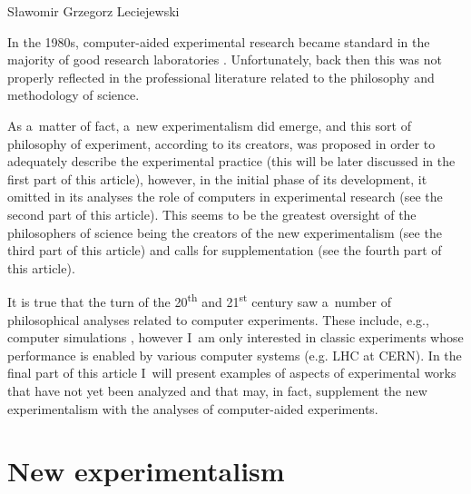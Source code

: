 \begin{artengenv}{Sławomir Grzegorz Leciejewski}
\enlargethispage{1.5\baselineskip}

In the 1980s, computer-aided experimental research became standard in the majority of good research laboratories 
\parencite[][]{crowley-milling_computer_1974}. %
 Unfortunately, back then this was not properly reflected in the professional literature related to the philosophy and methodology of science.



As a~matter of fact, a~new experimentalism did emerge, and this sort of philosophy of experiment, according to its creators, was proposed in order to adequately describe the experimental practice (this will be later discussed in the first part of this article), however, in the initial phase of its development, it omitted in its analyses the role of computers in experimental research (see the second part of this article). This seems to be the greatest oversight of the philosophers of science being the creators of the new experimentalism (see the third part of this article) and calls for supplementation (see the fourth part of this article).



It is true that the turn of the 20\textsuperscript{th} and 21\textsuperscript{st} century saw a~number of philosophical analyses related to computer experiments. These include, e.g., computer simulations 
\parencites[][]{bartz-beielstein_new_2005}[][]{giere_is_2009}[][]{guala_models_2002}[][]{morgan_ising_1999}[][]{humphreys_computational_1995}[][]{morgan_experiments_2003}[][]{peschard_modeling_2009}[][]{winsberg_science_2010}[][]{burge_computer_1998}[][]{epstein_agent-based_1999}[][]{hartmann_world_1996}[][]{lenhard_computer_2007}[][]{morrison_models_2009}[][]{parker_computer_2013}, %
 however I~am only interested in classic experiments whose performance is enabled by various computer systems (e.g. LHC at CERN). In the final part of this article I~will present examples of aspects of experimental works that have not yet been analyzed and that may, in fact, supplement the new experimentalism with the analyses of computer-aided experiments.

\enlargethispage{2\baselineskip}

\section*{New experimentalism}


\end{artengenv}
